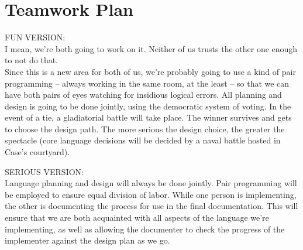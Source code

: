 \documentclass{article} %
\begin{document}
\section{Teamwork Plan}
FUN VERSION:\\
I mean, we're both going to work on it. Neither of us trusts the other one enough to not do that.\\
Since this is a new area for both of us, we're probably going to use a kind of pair programming -- always working in the same room, at the least -- so that we can 
have both pairs of eyes watching for insidious logical errors. All planning and design is going to be done jointly, using the democratic system of voting. In the event
of a tie, a gladiatorial battle will take place. The winner survives and gets to choose the design path. The more serious the design choice, the greater the spectacle 
(core language decisions will be decided by a naval battle hosted in Case's courtyard).

SERIOUS VERSION:\\
Language planning and design will always be done jointly. Pair programming will be employed to ensure equal division of labor. While one person is implementing, the 
other is documenting the process for use in the final documentation. This will ensure that we are both acquainted with all aspects of the language we're
implementing, as well as allowing the documenter to check the progress of the implementer against the design plan as we go.
\end{document}
